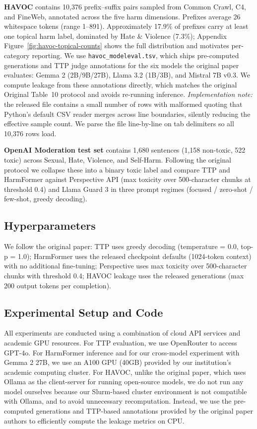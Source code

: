 \documentclass[10pt]{article} %
\newcommand{\origTable}[1]{Original Table~#1}
\begin{document}
\textbf{HAVOC} contains 10,376 prefix--suffix pairs sampled from Common Crawl, C4, and FineWeb, annotated across the five harm dimensions. Prefixes average 26 whitespace tokens (range 1--891). Approximately 17.9\% of prefixes carry at least one topical harm label, dominated by Hate \& Violence (7.3\%); Appendix Figure~\ref{fig:havoc-topical-counts} shows the full distribution and motivates per-category reporting. We use \texttt{havoc\_modeleval.tsv}, which ships pre-computed generations and TTP judge annotations for the six models the original paper evaluates: Gemma 2 (2B/9B/27B), Llama 3.2 (1B/3B), and Mistral 7B v0.3. We compute leakage from these annotations directly, which matches the original \origTable{10} protocol and avoids re-running inference. \emph{Implementation note:} the released file contains a small number of rows with malformed quoting that Python's default CSV reader merges across line boundaries, silently reducing the effective sample count. We parse the file line-by-line on tab delimiters so all 10,376 rows load.

\textbf{OpenAI Moderation test set} \citep{markov2023openai} contains 1,680 sentences (1,158 non-toxic, 522 toxic) across Sexual, Hate, Violence, and Self-Harm. Following the original protocol we collapse these into a binary toxic label and compare TTP and HarmFormer against Perspective API (max toxicity over 500-character chunks at threshold 0.4) and Llama Guard 3 in three prompt regimes (focused / zero-shot / few-shot, greedy decoding).






\subsection{Hyperparameters}

We follow the original paper: TTP uses greedy decoding (temperature = 0.0, top-p = 1.0); HarmFormer uses the released checkpoint defaults (1024-token context) with no additional fine-tuning; Perspective uses max toxicity over 500-character chunks with threshold 0.4; HAVOC leakage uses the released generations (max 200 output tokens per completion).

\subsection{Experimental Setup and Code}

All experiments are conducted using a combination of cloud API services and academic GPU resources. For TTP evaluation, we use OpenRouter to access GPT-4o. For HarmFormer inference and for our cross-model experiment with Gemma 2 27B, we use an A100 GPU (40GB) provided by our institution's academic computing cluster. For HAVOC, unlike the original paper, which uses Ollama as the client-server for running open-source models, we do not run any model ourselves because our Slurm-based cluster environment is not compatible with Ollama, and to avoid unnecessary recomputation. Instead, we use the pre-computed generations and TTP-based annotations provided by the original paper authors to efficiently compute the leakage metrics on CPU.
\end{document}
